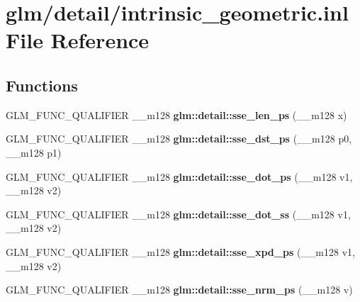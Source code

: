 \hypertarget{intrinsic__geometric_8inl}{\section{glm/detail/intrinsic\-\_\-geometric.inl File Reference}
\label{intrinsic__geometric_8inl}
}
\subsection*{Functions}
\begin{DoxyCompactItemize}
\item 
\hypertarget{namespaceglm_1_1detail_aa49baf7bcbe9eb783a85bcd3ce8d8dba}{G\-L\-M\-\_\-\-F\-U\-N\-C\-\_\-\-Q\-U\-A\-L\-I\-F\-I\-E\-R \-\_\-\-\_\-m128 {\bfseries glm\-::detail\-::sse\-\_\-len\-\_\-ps} (\-\_\-\-\_\-m128 x)}\label{namespaceglm_1_1detail_aa49baf7bcbe9eb783a85bcd3ce8d8dba}

\item 
\hypertarget{namespaceglm_1_1detail_a9d4832acb69aa3f67d6e06c64b29dddd}{G\-L\-M\-\_\-\-F\-U\-N\-C\-\_\-\-Q\-U\-A\-L\-I\-F\-I\-E\-R \-\_\-\-\_\-m128 {\bfseries glm\-::detail\-::sse\-\_\-dst\-\_\-ps} (\-\_\-\-\_\-m128 p0, \-\_\-\-\_\-m128 p1)}\label{namespaceglm_1_1detail_a9d4832acb69aa3f67d6e06c64b29dddd}

\item 
\hypertarget{namespaceglm_1_1detail_ad4dfd210b559dcff4cbc4a674477b90b}{G\-L\-M\-\_\-\-F\-U\-N\-C\-\_\-\-Q\-U\-A\-L\-I\-F\-I\-E\-R \-\_\-\-\_\-m128 {\bfseries glm\-::detail\-::sse\-\_\-dot\-\_\-ps} (\-\_\-\-\_\-m128 v1, \-\_\-\-\_\-m128 v2)}\label{namespaceglm_1_1detail_ad4dfd210b559dcff4cbc4a674477b90b}

\item 
\hypertarget{namespaceglm_1_1detail_a794070b64c8a2bd03e393c79be9ed17e}{G\-L\-M\-\_\-\-F\-U\-N\-C\-\_\-\-Q\-U\-A\-L\-I\-F\-I\-E\-R \-\_\-\-\_\-m128 {\bfseries glm\-::detail\-::sse\-\_\-dot\-\_\-ss} (\-\_\-\-\_\-m128 v1, \-\_\-\-\_\-m128 v2)}\label{namespaceglm_1_1detail_a794070b64c8a2bd03e393c79be9ed17e}

\item 
\hypertarget{namespaceglm_1_1detail_a0692599f2cf8b5a9fd64ccf7023805c7}{G\-L\-M\-\_\-\-F\-U\-N\-C\-\_\-\-Q\-U\-A\-L\-I\-F\-I\-E\-R \-\_\-\-\_\-m128 {\bfseries glm\-::detail\-::sse\-\_\-xpd\-\_\-ps} (\-\_\-\-\_\-m128 v1, \-\_\-\-\_\-m128 v2)}\label{namespaceglm_1_1detail_a0692599f2cf8b5a9fd64ccf7023805c7}

\item 
\hypertarget{namespaceglm_1_1detail_a9f1826e935d79fc46faaf70499cba320}{G\-L\-M\-\_\-\-F\-U\-N\-C\-\_\-\-Q\-U\-A\-L\-I\-F\-I\-E\-R \-\_\-\-\_\-m128 {\bfseries glm\-::detail\-::sse\-\_\-nrm\-\_\-ps} (\-\_\-\-\_\-m128 v)}\label{namespaceglm_1_1detail_a9f1826e935d79fc46faaf70499cba320}


\end{DoxyCompactItemize}
